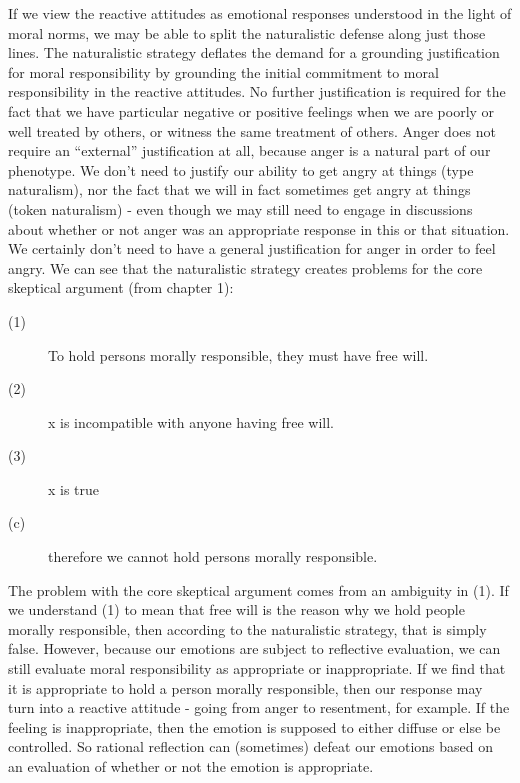 \documentclass[phd,12pt,oneside,paper=letterpaper]{ubcthesis}
\begin{document}
If we view the reactive attitudes as emotional responses understood in the light of moral norms, we may be able to split the naturalistic defense along just those lines. The naturalistic strategy deflates the demand for a grounding justification for moral responsibility by grounding the initial commitment to moral responsibility in the reactive attitudes. No further justification is required for the fact that we have particular negative or positive feelings when we are poorly or well treated by others, or witness the same treatment of others. Anger does not require an ``external'' justification at all, because anger is a natural part of our phenotype. We don't need to justify our ability to get angry at things (type naturalism), nor the fact that we will in fact sometimes get angry at things (token naturalism) - even though we may still need to engage in discussions about whether or not anger was an appropriate response in this or that situation. We certainly don't need to have a general justification for anger in order to feel angry. We can see that the naturalistic strategy creates problems for the core skeptical argument (from chapter 1):

\begin{description}
\item[(1)] To hold persons morally responsible, they must have free will.
\item[(2)] x is incompatible with anyone having free will.
\item[(3)] x is true
\item[(c)] therefore we cannot hold persons morally responsible.
\end{description}

The problem with the core skeptical argument comes from an ambiguity in (1). If we understand (1) to mean that free will is the reason why we hold people morally responsible, then according to the naturalistic strategy, that is simply false. However, because our emotions are subject to reflective evaluation, we can still evaluate moral responsibility as appropriate or inappropriate. If we find that it is appropriate to hold a person morally responsible, then our response may turn into a reactive attitude - going from anger to resentment, for example. If the feeling is inappropriate, then the emotion is supposed to either diffuse or else be controlled. So rational reflection can (sometimes) defeat our emotions based on an evaluation of whether or not the emotion is appropriate. 
\end{document}
